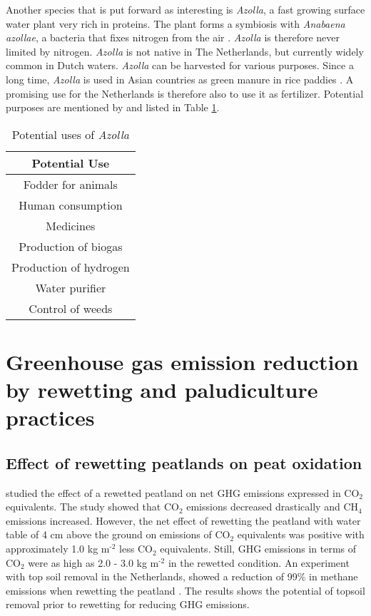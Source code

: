 \documentclass[a4paper,12pt]{scrbook}
\newcommand{\sur}[1]{\ensuremath{^{\textrm{#1}}}}
\newcommand{\sous}[1]{\ensuremath{_{\textrm{#1}}}}
\begin{document}
Another species that is put forward as interesting is \textit{Azolla}, a fast growing surface water plant very rich in proteins. The plant forms a symbiosis with \textit{Anabaena azollae}, a bacteria that fixes nitrogen from the air \citep{wagner1997azolla}. \textit{Azolla} is therefore never limited by nitrogen. \textit{Azolla} is not native in The Netherlands, but currently widely common in Dutch waters. \textit{Azolla} can be harvested for various purposes. Since a long time, \textit{Azolla} is used in Asian countries as green manure in rice paddies \citep{wagner1997azolla}. A promising use for the Netherlands is therefore also to use it as fertilizer. Potential purposes are mentioned by \citet{wagner1997azolla} and listed in Table \ref{tab:azolla}.

\begin{table}
\centering
\caption{Potential uses of \textit{Azolla}}
\begin{tabular}{|c|}
\hline 
\textbf{Potential Use} \\ 
\hline 
Fodder for animals \\ 
\hline 
Human consumption \\ 
\hline 
Medicines \\ 
\hline 
Production of biogas \\ 
\hline 
Production of hydrogen \\ 
\hline 
Water purifier \\ 
\hline 
Control of weeds \\ 
\hline 
\end{tabular} 
\label{tab:azolla}
\end{table}

\section{Greenhouse gas emission reduction by rewetting and paludiculture practices}

\subsection{Effect of rewetting peatlands on peat oxidation}

\citet{van2013rewetting} studied the effect of a rewetted peatland on net GHG emissions expressed in CO\sous{2} equivalents. The study showed that CO\sous{2} emissions decreased drastically and CH\sous{4} emissions increased. However, the net effect of rewetting the peatland with water table of 4 cm above the ground on emissions of CO\sous{2} equivalents was positive with approximately 1.0 kg m\sur{-2} less CO\sous{2} equivalents. Still, GHG emissions in terms of CO\sous{2} were as high as 2.0 - 3.0 kg m\sur{-2} in the rewetted condition. An experiment with top soil removal in the Netherlands, showed a reduction of 99\% in methane emissions when rewetting the peatland \citep{harpenslager2015rewetting}. The results shows the potential of topsoil removal prior to rewetting for reducing GHG emissions. 
\end{document}
